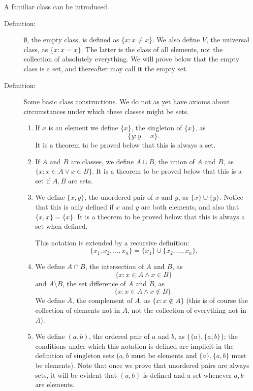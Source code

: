 \documentclass[12pt]{article}
\begin{document}
A familiar class can be introduced.

\begin{description}

\item[Definition:]  $\emptyset$, the empty class, is defined as $\{x:x\neq x\}$.  We also define $V$, the universal class, as $\{x:x=x\}$.  The latter is the class of all elements, not the collection of absolutely everything.  We will prove below that the empty class is a set, and thereafter may call it the empty set.

\item[Definition:]  Some basic class constructions.  We do not as yet have axioms about circumstances under which these classes might be sets.

\begin{enumerate}

\item  If $x$ is an element we define $\{x\}$, the singleton of $\{x\}$,  as $$\{y:y=x\}.$$   It is a theorem to be proved below that this is always a set.

\item  If $A$ and $B$ are classes, we define $A \cup B$, the union of $A$ and $B$, as $\{x:x \in A \vee x \in B\}$.  It is a theorem to be proved below that this is a set if $A,B$ are sets.

\item  We define $\{x,y\}$, the unordered pair of $x$ and $y$,  as $\{x\} \cup \{y\}$.  Notice that this is only defined if $x$ and $y$ are both elements, and also that $\{x,x\} = \{x\}$.
It is a theorem to be proved below that this is always a set when defined.

This notation is extended by a recursive definition:  $$\{x_1,x_2,\ldots,x_n\} = \{x_1\} \cup \{x_2,\ldots,x_n\}.$$

\item We define $A \cap B$, the intersection of $A$ and $B$, as $$\{x:x \in A \wedge x \in B\}$$ and $A \setminus B$, the set difference of $A$ and $B$,  as $$\{x:x \in A \wedge x \not\in B\}.$$  We define $\overline{A}$, the complement of $A$,  as $\{x:x \not\in A\}$ (this is of course the collection of elements not in $A$, not the collection of everything not in $A$).

\item We define $(a,b)$, the ordered pair of $a$ and $b$,  as $\{\{a\},\{a,b\}\}$;  the conditions under which this notation is defined are implicit in the definition of singleton sets ($a,b$ must be elements
and $\{a\}, \{a,b\}$ must be elements).  Note that once we prove that unordered pairs are always sets, it will be evident that $(a,b)$ is defined and a set whenever $a,b$ are elements.


\end{enumerate}
\end{description}
\end{document}
